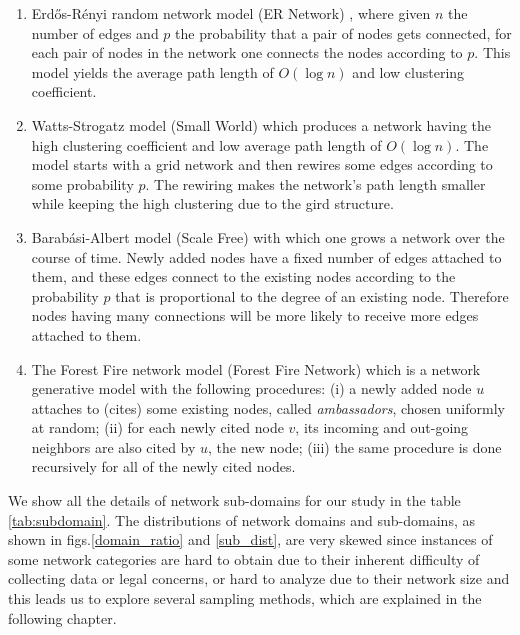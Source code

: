 \documentclass{article}
\begin{document}
	\begin{enumerate}
		\item Erd\H{o}s-R\'enyi random network model (ER Network) \cite{ER_Network}, where given $n$ the number of edges and $p$ the probability that a pair of nodes gets connected, for each pair of nodes in the network one connects the nodes according to $p$. This model yields the average path length of $O(\log n)$ and low clustering coefficient.
		
		\item Watts-Strogatz model (Small World) \cite{watts1998cds} which produces a network having the high clustering coefficient and low average path length of $O(\log n)$. The model starts with a grid network and then rewires some edges according to some probability $p$. The rewiring makes the network's path length smaller while keeping the high clustering due to the gird structure.
		
		\item Barab\'asi-Albert model (Scale Free) \cite{Barabasi99emergenceScaling} with which one grows a network over the course of time. Newly added nodes have a fixed number of edges attached to them, and these edges connect to the existing nodes according to the probability $p$ that is proportional to the degree of an existing node. Therefore nodes having many connections will be more likely to receive more edges attached to them.
		
		\item The Forest Fire network model (Forest Fire Network) \cite{ForestFire} which is a network generative model with the following procedures: (i) a newly added node $u$ attaches to (cites) some existing nodes, called \textit{ambassadors}, chosen uniformly at random; (ii) for each newly cited node $v$, its incoming and out-going neighbors are also cited by $u$, the new node; (iii) the same procedure is done recursively for all of the newly cited nodes.
	\end{enumerate}

We show all the details of network sub-domains for our study in the table \ref{tab:subdomain}. The distributions of network domains and sub-domains, as shown in figs.\ref{domain_ratio} and \ref{sub_dist}, are very skewed since instances of some network categories are hard to obtain due to their inherent difficulty of collecting data or legal concerns, or hard to analyze due to their network size and this leads us to explore several sampling methods, which are explained in the following chapter. 
\end{document}
